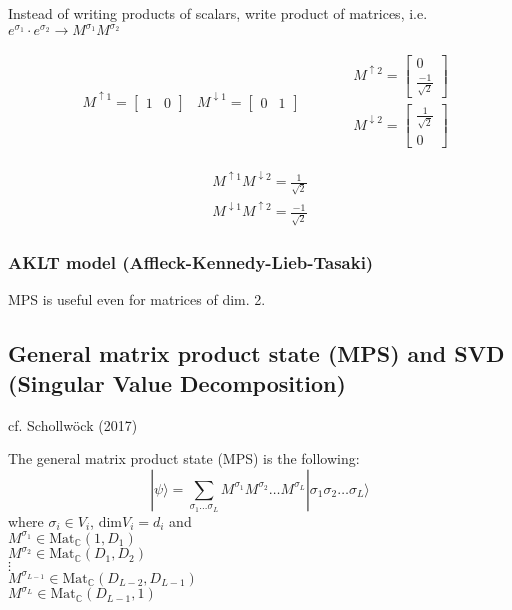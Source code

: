 \documentclass[10pt]{amsart}
\begin{document}
\begin{multicols*}{2}
Instead of writing products of scalars, write product of matrices, i.e. $e^{\sigma_1} \cdot e^{\sigma_2} \to M^{\sigma_1} M^{\sigma_2}$

\[
\begin{gathered}
\begin{aligned}
	& M^{\uparrow 1} = \left[ \begin{matrix} 1 & 0 \end{matrix} \right]
	& M^{\downarrow 1} = \left[ \begin{matrix} 0 & 1 \end{matrix} \right] 
	\end{aligned} \quad \quad \, \begin{aligned}
	& M^{\uparrow 2 } = \left[ \begin{matrix} 0 \\ \frac{-1}{\sqrt{2}} \end{matrix} \right] \\
	& M^{\downarrow 2} = \left[ \begin{matrix} \frac{1}{\sqrt{2}} \\ 0 \end{matrix} \right] 
	\end{aligned}
\end{gathered}
\]

\[
\begin{gathered}
M^{\uparrow 1} M^{\downarrow 2} = \frac{1}{\sqrt{2}} \\ 
M^{\downarrow 1} M^{\uparrow 2} = \frac{-1}{\sqrt{2}} 
\end{gathered}
\]

\subsubsection{AKLT model (Affleck-Kennedy-Lieb-Tasaki)}

MPS is useful even for matrices of dim. 2.


\subsection{General matrix product state (MPS) and SVD (Singular Value Decomposition)}

cf. Schollw\"{o}ck (2017) \cite{ArSo2017}

The general matrix product state (MPS) is the following:
\begin{equation}
|\psi \rangle = \sum_{ \sigma_1 \dots \sigma_L } M^{\sigma_1} M^{\sigma_2} \dots M^{\sigma_L} | \sigma_1 \sigma_2 \dots \sigma_L \rangle
\end{equation}
where $\sigma_i \in V_i$, $\text{dim}V_i = d_i$ and \\
$M^{\sigma_1} \in \text{Mat}_{\mathbb{C}}(1, D_1)$ \\ 
$M^{\sigma_2} \in \text{Mat}_{\mathbb{C}}(D_1, D_2)$ \\ 
$\vdots$ \\ 
$M^{\sigma_{L-1}} \in \text{Mat}_{\mathbb{C}}(D_{L-2}, D_{L-1})$ \\ 
$M^{\sigma_L} \in \text{Mat}_{\mathbb{C}}(D_{L-1}, 1)$ \\ 


\end{multicols*}
\end{document}
